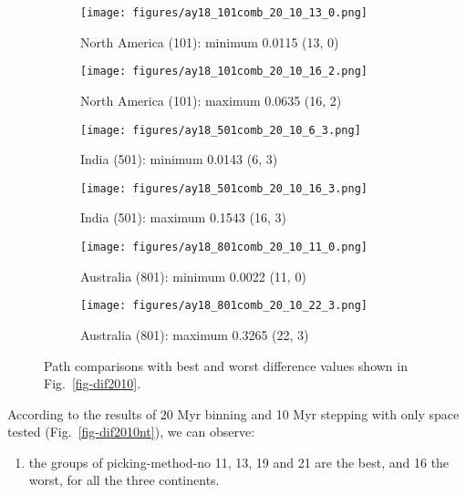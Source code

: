 \begin{figure*}
	\centering
	\begin{subfigure}{.43\textwidth}
		\texttt{[image: figures/ay18\_101comb\_20\_10\_13\_0.png]}
		\caption{North America (101): minimum 0.0115 (13, 0)}\label{fig-nac-2010130}
	\end{subfigure}
	\begin{subfigure}{.43\textwidth}
		\texttt{[image: figures/ay18\_101comb\_20\_10\_16\_2.png]}
		\caption{North America (101): maximum 0.0635 (16, 2)}\label{fig-nac-2010162}
	\end{subfigure}
	\vspace{.1em}
	\begin{subfigure}{.43\textwidth}
		\texttt{[image: figures/ay18\_501comb\_20\_10\_6\_3.png]}
		\caption{India (501): minimum 0.0143 (6, 3)}\label{fig-ind-201063}
	\end{subfigure}
	\begin{subfigure}{.43\textwidth}
		\texttt{[image: figures/ay18\_501comb\_20\_10\_16\_3.png]}
		\caption{India (501): maximum 0.1543 (16, 3)}\label{fig-ind-2010163}
	\end{subfigure}
	\vspace{.1em}
	\begin{subfigure}{.43\textwidth}
		\texttt{[image: figures/ay18\_801comb\_20\_10\_11\_0.png]}
		\caption{Australia (801): minimum 0.0022 (11, 0)}\label{fig-au-2010110}
	\end{subfigure}
	\begin{subfigure}{.43\textwidth}
		\texttt{[image: figures/ay18\_801comb\_20\_10\_22\_3.png]}
		\caption{Australia (801): maximum 0.3265 (22, 3)}\label{fig-au-2010223}
	\end{subfigure}
	\caption[Best and worst differences with test (20 Myr bin, 10 Myr
step)]{Path comparisons with best and worst difference values shown in
Fig.~\ref{fig-dif2010}.}\label{fig-dif2010bw}
\end{figure*}

According to the results of 20 Myr binning and 10 Myr stepping with only space
tested (Fig.~\ref{fig-dif2010nt}), we can observe:

\begin{enumerate}
  \item the groups of picking-method-no 11, 13, 19 and 21 are the best, and 16
        the worst, for all the three continents.
\end{enumerate}

